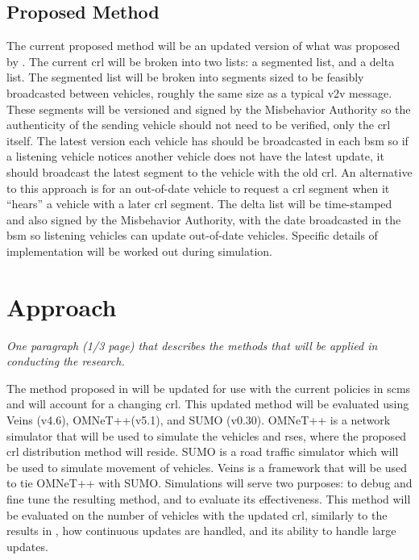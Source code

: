 \documentclass {article}
\newcommand{\sechint}[1]{\small{\emph{#1}} \bigskip}
\begin{document}
\subsection{Proposed Method}
The current proposed method will be an updated version of what was proposed by \autocite{brecht_scms_nodate}. The current \gls{crl} will be broken into two lists: a segmented list, and a delta list. The segmented list will be broken into segments sized to be feasibly broadcasted between vehicles, roughly the same size as a typical \gls{v2v} message. These segments will be versioned and signed by the Misbehavior Authority so the authenticity of the sending vehicle should not need to be verified, only the \gls{crl} itself. The latest version each vehicle has should be broadcasted in each \gls{bsm} so if a listening vehicle notices another vehicle does not have the latest update, it should broadcast the latest segment to the vehicle with the old \gls{crl}. An alternative to this approach is for an out-of-date vehicle to request a \gls{crl} segment when it ``hears'' a vehicle with a later \gls{crl} segment. The delta list will be time-stamped and also signed by the Misbehavior Authority, with the date broadcasted in the \gls{bsm} so listening vehicles can update out-of-date vehicles. Specific details of implementation will be worked out during simulation.

\section{Approach}{\sechint{One paragraph (1/3 page) that describes the methods that will be applied in conducting the research.}}

The method proposed in \autocite{haas_efficient_2011} will be updated for use with the current policies in \gls{scms} and will account for a changing \gls{crl}. This updated method will be evaluated using Veins (v4.6), OMNeT++(v5.1), and SUMO (v0.30). OMNeT++ is a network simulator that will be used to simulate the vehicles and \gls{rse}s, where the proposed \gls{crl} distribution method will reside. SUMO is a road traffic simulator which will be used to simulate movement of vehicles. Veins is a framework that will be used to tie OMNeT++ with SUMO. Simulations will serve two purposes: to debug and fine tune the resulting method, and to evaluate its effectiveness. This method will be evaluated on the number of vehicles with the updated \gls{crl}, similarly to the results in \autocite{haas_efficient_2011}, how continuous updates are handled, and its ability to handle large updates.
\end{document}
